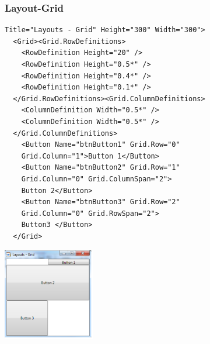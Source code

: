 \subsubsection{Layout-Grid}
\begin{minipage}{14cm}
\begin{lstlisting}[style=CSharp]
  Title="Layouts - Grid" Height="300" Width="300">
  <Grid><Grid.RowDefinitions>
    <RowDefinition Height="20" />
    <RowDefinition Height="0.5*" />
    <RowDefinition Height="0.4*" />
    <RowDefinition Height="0.1*" />
  </Grid.RowDefinitions><Grid.ColumnDefinitions>
    <ColumnDefinition Width="0.5*" />
    <ColumnDefinition Width="0.5*" />
  </Grid.ColumnDefinitions>
    <Button Name="btnButton1" Grid.Row="0"
    Grid.Column="1">Button 1</Button>
    <Button Name="btnButton2" Grid.Row="1"
    Grid.Column="0" Grid.ColumnSpan="2">
    Button 2</Button>
    <Button Name="btnButton3" Grid.Row="2"
    Grid.Column="0" Grid.RowSpan="2">
    Button3 </Button>
  </Grid>
\end{lstlisting}
\end{minipage}
\begin{minipage}{4cm}
  \includegraphics[width=4cm]{images/XAML/Grid}
\end{minipage}

\newpage
